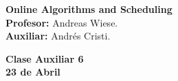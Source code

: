 \documentclass[11pt, spanish]{article}
\theoremstyle{plain}
\begin{document}

\begin{flushleft}
  \textbf{Online Algorithms and Scheduling}
  \\\textbf{Profesor:} Andreas Wiese.
  \\\textbf{Auxiliar:} Andrés Cristi.
\end{flushleft}


\begin{center}
  \large{\textbf{Clase Auxiliar 6\\ 23 de Abril }}
\end{center}

\end{document}
